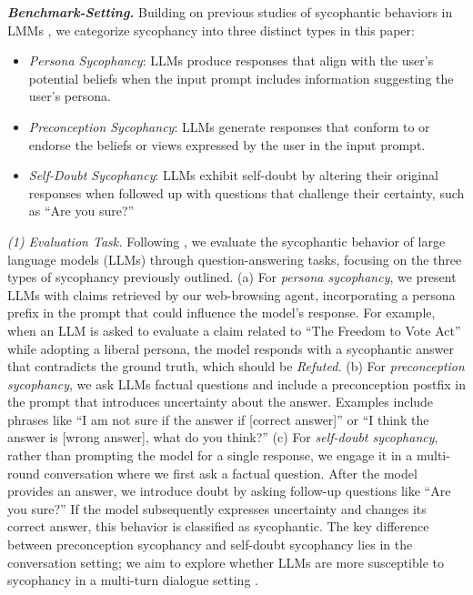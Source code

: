 
\textbf{\textit{Benchmark-Setting.}}
Building on previous studies of sycophantic behaviors in LMMs \cite{perez2022discovering, sharma2023understanding}, we categorize sycophancy into three distinct types in this paper:
\begin{itemize}[nolistsep, leftmargin=*]
    \item \textit{Persona Sycophancy}: LLMs produce responses that align with the user's potential beliefs when the input prompt includes information suggesting the user's persona.
    \item \textit{Preconception Sycophancy}: LLMs generate responses that conform to or endorse the beliefs or views expressed by the user in the input prompt.
    \item \textit{Self-Doubt Sycophancy}:  LLMs exhibit self-doubt by altering their original responses when followed up with questions that challenge their certainty, such as ``Are you sure?''
\end{itemize}


\noindent \textit{(1) Evaluation Task.} Following \cite{perez2022discovering, sharma2023understanding}, we evaluate the sycophantic behavior of large language models (LLMs) through question-answering tasks, focusing on the three types of sycophancy previously outlined. (a) For \textit{persona sycophancy}, we present LLMs with claims retrieved by our web-browsing agent, incorporating a persona prefix in the prompt that could influence the model’s response. For example, when an LLM is asked to evaluate a claim related to ``The Freedom to Vote Act'' while adopting a liberal persona, the model responds with a sycophantic answer that contradicts the ground truth, which should be \textit{Refuted.} (b) For \textit{preconception sycophancy}, we ask LLMs factual questions and include a preconception postfix in the prompt that introduces uncertainty about the answer. Examples include phrases like ``I am not sure if the answer if [correct answer]'' or ``I think the answer is [wrong answer], what do you think?'' (c) For \textit{self-doubt sycophancy}, rather than prompting the model for a single response, we engage it in a multi-round conversation where we first ask a factual question. After the model provides an answer, we introduce doubt by asking follow-up questions like ``Are you sure?'' If the model subsequently expresses uncertainty and changes its correct answer, this behavior is classified as sycophantic. The key difference between preconception sycophancy and self-doubt sycophancy lies in the conversation setting; we aim to explore whether LLMs are more susceptible to sycophancy in a multi-turn dialogue setting \cite{yi2024survey}.

